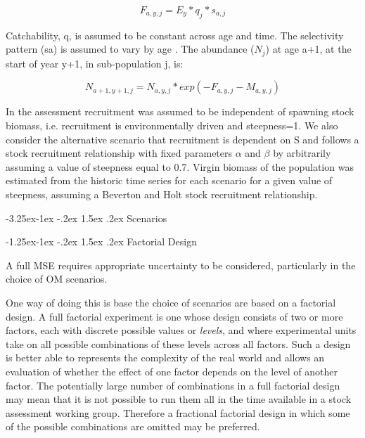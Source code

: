 \documentclass[a4paper, 10pt]{article}
\makeatletter
\renewcommand{\subsubsection}{\@startsection{subsubsection}{3}{\z@}%
  {-1.25ex\@plus -1ex \@minus -.2ex}%
  {1.5ex \@plus .2ex}%
  {\normalfont\slshape}}
\renewcommand{\subsection}{\@startsection{subsection}{2}{\z@}%
  {-3.25ex\@plus -1ex \@minus -.2ex}%
  {1.5ex \@plus .2ex}%
  {\normalfont\bfseries\slshape}}
\makeatother
\begin{document}
\begin{equation}F_{a,y,j} = E_y*q_j*s_{a,j} \end{equation}

Catchability, q, is assumed to be constant across age and time.
The selectivity pattern (sa) is assumed to vary by age .
The abundance ($N_j$) at age a+1, at the start of year y+1, in sub-population j, is:

\begin{equation}N_{a+1,y+1,j} = N_{a,y,j}*exp(-F_{a,y,j}- M_{a,y,j}) \end{equation}

In the assessment recruitment was assumed to be independent  of spawning stock biomass, i.e. recruitment is environmentally driven and steepness=1. 
We also consider the alternative  scenario that recruitment is dependent on S and follows a \cite{beverton_dynamics_1993} stock recruitment relationship with 
fixed parameters $\alpha$ and $\beta$ by arbitrarily assuming a value of steepness equal to 0.7. 
Virgin biomass of the population was estimated from the historic time series for each scenario 
for a given value of steepness, assuming a Beverton and Holt stock recruitment relationship.
 
\subsection{Scenarios}


\subsubsection{Factorial Design}

A full MSE requires appropriate uncertainty to be considered, particularly in the choice of OM scenarios. 
 
One way of doing this is base the choice of scenarios are based on a factorial design.  A full factorial experiment is one whose 
design consists of two or more factors, each with discrete possible values or \textit{levels}, and where experimental 
units take on all possible combinations of these levels across all factors. Such a design is better able to
represents the complexity of the real world and allows an evaluation of whether the effect of one factor
depends on the level of another factor. The potentially large number of combinations in a full factorial design 
may mean that it is not possible to run them all in the time available in a stock assessment working group.
Therefore a fractional factorial design in which some of the possible combinations are omitted may be preferred.
\end{document}
